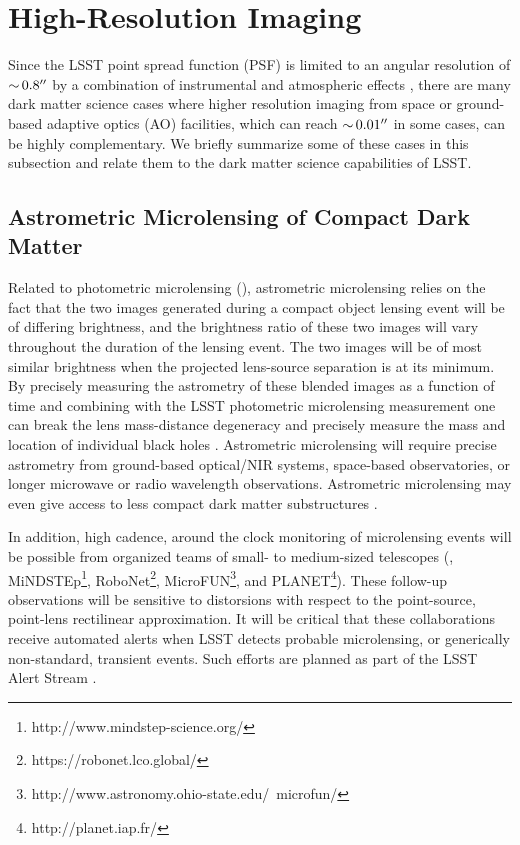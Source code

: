 \section{High-Resolution Imaging }
\label{sec:highres}

Since the LSST point spread function (PSF) is limited to an angular resolution of $ {\sim}\, 0.8''$ by a combination of instrumental and  atmospheric effects \citep{0805.2366}, there are many dark matter science cases where higher resolution imaging from space or ground-based adaptive optics (AO) facilities, which can reach $ {\sim}\, 0.01''$ in some cases, can be highly complementary. We briefly summarize some of these cases in this subsection and relate them to the dark matter science capabilities of LSST.

\subsection{Astrometric Microlensing of Compact Dark Matter }
\label{sec:astrometric_microlens}
Related to photometric microlensing (), astrometric microlensing relies on the fact that the two images generated during a compact object lensing event will be of differing brightness, and the brightness ratio of these two images will vary throughout the duration of the lensing event.
The two images will be of most similar brightness when the projected lens-source separation is at its minimum.
By precisely measuring the astrometry of these blended images as a function of time and combining with the LSST photometric microlensing measurement one can break the lens mass-distance degeneracy and precisely measure the mass and location of individual black holes \citep{2015ApJ...814L..11Y}.
Astrometric microlensing will require precise astrometry from ground-based optical/NIR systems, space-based observatories, or longer microwave or radio wavelength observations.
Astrometric microlensing may even give access to less compact dark matter substructures \citep{1804.01991}.

In addition, high cadence, around the clock monitoring of microlensing events will be possible from organized teams of small- to medium-sized telescopes (\eg, MiNDSTEp\footnote{http://www.mindstep-science.org/}, RoboNet\footnote{https://robonet.lco.global/}, MicroFUN\footnote{http://www.astronomy.ohio-state.edu/~microfun/}, and PLANET\footnote{http://planet.iap.fr/}). 
These follow-up observations will be sensitive to distorsions with respect to the point-source, point-lens rectilinear approximation.
It will be critical that these collaborations receive automated alerts when LSST detects probable microlensing, or generically non-standard, transient events. 
Such efforts are planned as part of the LSST Alert Stream \citep{0805.2366}.

